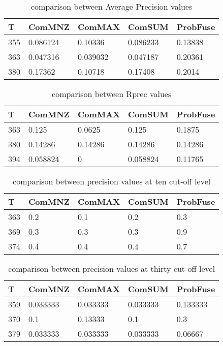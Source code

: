 \documentclass[12pt,journal]{IEEEtran}
\begin{document}
\begin{table}[h!]
\centering
\caption{comparison between Average Precision values}
\begin{tabular}{|l|l|l|l|l|}
\hline
T   & ComMNZ    & ComMAX   & ComSUM    & ProbFuse \\ \hline
355 & 0.086124  & 0.10336  & 0.086233  & 0.13838 \\ \hline
363 & 0.047316  & 0.039032 & 0.047187  & 0.20361  \\ \hline
380 & 0.17362   & 0.10718  & 0.17408   & 0.2014 \\ \hline
\end{tabular}
\end{table}

\begin{table}[h!]
\centering
\caption{comparison between Rprec values}
\begin{tabular}{|l|l|l|l|l|}
\hline
T   & ComMNZ   & ComMAX  & ComSUM   & ProbFuse \\ \hline
363 & 0.125    & 0.0625  & 0.125    & 0.1875     \\ \hline
380 & 0.14286  & 0.14286 & 0.14286  & 0.14286  \\ \hline
394 & 0.058824 & 0       & 0.058824 & 0.11765  \\  \hline
\end{tabular} 
\end{table}


\begin{table}[h!]
\centering
\caption{comparison between precision values at ten cut-off level}
\begin{tabular}{|l|l|l|l|l|}
\hline
T   & ComMNZ & ComMAX & ComSUM & ProbFuse \\ \hline
363 & 0.2    & 0.1    & 0.2    & 0.3     \\ \hline
369 & 0.3    & 0.3    & 0.3    & 0.9     \\ \hline
374 & 0.4    & 0.4    & 0.4    & 0.7      \\ \hline
\end{tabular}
\end{table}

\begin{table}[h!]
\centering
\caption{comparison between precision values at thirty cut-off level}
\begin{tabular}{|l|l|l|l|l|}
\hline
T   & ComMNZ   & ComMAX   & ComSUM   & ProbFuse \\ \hline
359 & 0.033333 & 0.033333 & 0.033333 & 0.133333  \\ \hline
370 & 0.1      & 0.13333  & 0.1      & 0.3  \\ \hline
379 & 0.033333 & 0.033333 & 0.033333 & 0.06667     \\ \hline
\end{tabular}
\end{table}
\end{document}
